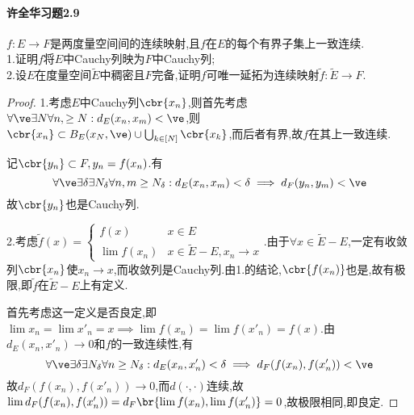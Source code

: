 \documentclass{article}
\begin{document}
\paragraph{许全华习题2.9}$f:E\to F$是两度量空间间的连续映射,且$f$在$E$的每个有界子集上一致连续.\\
1.证明$f$将$E$中Cauchy列映为$F$中Cauchy列;\\
2.设$E$在度量空间$\tilde{E}$中稠密且$F$完备,证明$f$可唯一延拓为连续映射$\tilde{f}:\tilde{E}\to F$.
\begin{proof}
    1.考虑$E$中Cauchy列$\cbr{x_n}$,则首先考虑$\forall \ve \exists N\forall n,\geq N:d_E(x_n,x_m)<\ve$,则$ \cbr{x_n}\subset B_E(x_N,\ve)\cup\bigcup_{k\in [N]}\cbr{x_k}$,而后者有界,故$f$在其上一致连续.

    记$\cbr{y_n}\subset F, y_n=f(x_n)$.有$$\forall \ve \exists \delta \exists N_\delta \forall n,m\geq N_\delta:d_E(x_n,x_m)<\delta\implies d_F(y_n,y_m)<\ve$$
    故$\cbr{y_n}$也是Cauchy列.

    2.考虑$\tilde{f}(x)=\begin{cases}
        f(x)&x\in E\\ \lim f(x_n)&x\in \tilde{E}-E, x_n\to x
    \end{cases}.$由于$\forall x\in \tilde{E}-E$,一定有收敛列$\cbr{x_n}$使$x_n\to x$,而收敛列是Cauchy列.由1.的结论,$\cbr{f(x_n)}$也是,故有极限,即$\tilde{f}$在$\tilde{E}-E$上有定义.

    首先考虑这一定义是否良定,即$\lim x_n=\lim x'_n=x\implies \lim f(x_n)=\lim f(x'_n)=f(x)$.由$d_E(x_n,x'_n)\to 0$和$f$的一致连续性,有$$\forall\ve \exists \delta\exists N_\delta\forall n\geq N_\delta:d_E(x_n,x'_n)<\delta\implies d_F(f(x_n),f(x'_n))<\ve$$
    故$d_F(f(x_n),f(x'_n))\to 0$,而$d(\cdot,\cdot)$连续,故$\lim d_F(f(x_n),f(x'_n))=d_F\br{\lim f(x_n),\lim f(x'_n)}=0$,故极限相同,即良定.


\end{proof}
\end{document}
